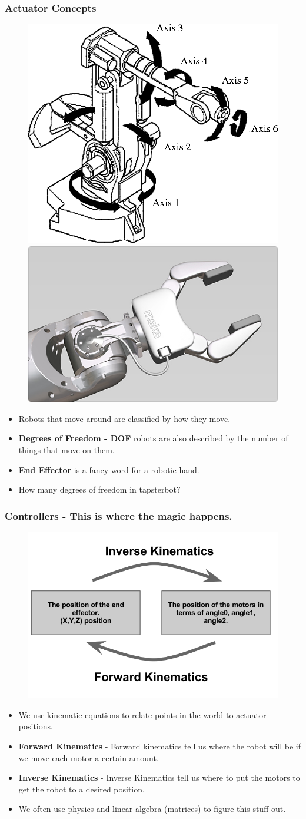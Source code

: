 \documentclass[compress]{beamer}
\begin{document}
\begin{frame}
  \frametitle{Actuator Concepts}
  \begin{figure}
     \includegraphics[width=0.4\linewidth]{6DOF.png}
     \quad
     \includegraphics[width=0.4\linewidth]{gripper.jpg}
  \end{figure}
   \begin{itemize}
   \item Robots that move around are classified by how they move.
   \item \textbf{Degrees of Freedom - DOF} robots are also described by the number of things that move on them. 
   \item \textbf{End Effector} is a fancy word for a robotic hand. 
   \item How many degrees of freedom in tapsterbot?
   \end{itemize}     
 \end{frame}
\begin{frame}
  \frametitle{Controllers - This is where the magic happens.}
  \begin{figure}
     \includegraphics[width=0.4\linewidth]{kinematics.png}
  \end{figure}
   \begin{itemize}
   \item We use kinematic equations to relate points in the world to actuator positions. 
   \item \textbf{Forward Kinematics} - Forward kinematics tell us where the robot will be if we move each motor a certain amount. 
   \item \textbf{Inverse Kinematics}  - Inverse Kinematics tell us where to put the motors to get the robot to a desired position. 
    \item We often use physics and linear algebra (matrices) to figure this stuff out. 
   \end{itemize}     
 \end{frame}
\end{document}
